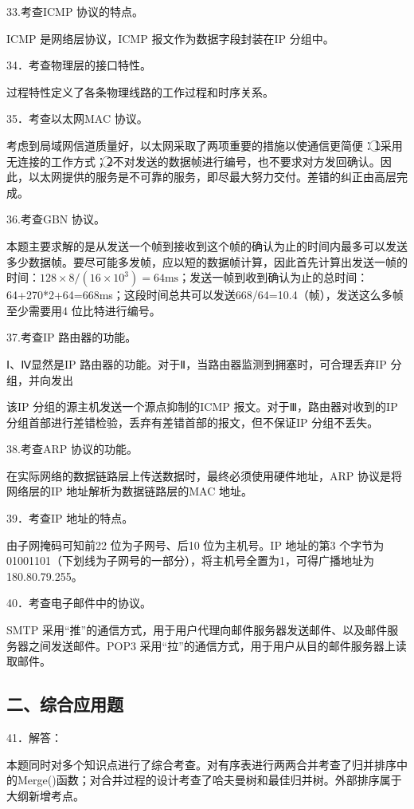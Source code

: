 \documentclass[UTF8,11pt]{ctexart}
\begin{document}
33.考查ICMP 协议的特点。


ICMP 是网络层协议，ICMP 报文作为数据字段封装在IP 分组中。


34．考查物理层的接口特性。


过程特性定义了各条物理线路的工作过程和时序关系。


35．考查以太网MAC 协议。


考虑到局域网信道质量好，以太网采取了两项重要的措施以使通信更简便：\textcircled{1}采用无连接的工作方式；\textcircled{2}不对发送的数据帧进行编号，也不要求对方发回确认。因此，以太网提供的服务是不可靠的服务，即尽最大努力交付。差错的纠正由高层完成。


36.考查GBN 协议。


本题主要求解的是从发送一个帧到接收到这个帧的确认为止的时间内最多可以发送多少数据帧。要尽可能多发帧，应以短的数据帧计算，因此首先计算出发送一帧的时间：\(\displaystyle 128\times8/(16\times10^3)=64\mathrm{ms}\)；发送一帧到收到确认为止的总时间：64+270*2+64=668ms；这段时间总共可以发送668/64=10.4（帧），发送这么多帧至少需要用4 位比特进行编号。


37.考查IP 路由器的功能。


Ⅰ、Ⅳ显然是IP 路由器的功能。对于Ⅱ，当路由器监测到拥塞时，可合理丢弃IP 分组，并向发出


该IP 分组的源主机发送一个源点抑制的ICMP 报文。对于Ⅲ，路由器对收到的IP 分组首部进行差错检验，丢弃有差错首部的报文，但不保证IP 分组不丢失。


38.考查ARP 协议的功能。


在实际网络的数据链路层上传送数据时，最终必须使用硬件地址，ARP 协议是将网络层的IP 地址解析为数据链路层的MAC 地址。


39．考查IP 地址的特点。


由子网掩码可知前22 位为子网号、后10 位为主机号。IP 地址的第3 个字节为01001101（下划线为子网号的一部分），将主机号全置为1，可得广播地址为180.80.79.255。


40．考查电子邮件中的协议。


SMTP 采用“推”的通信方式，用于用户代理向邮件服务器发送邮件、以及邮件服务器之间发送邮件。POP3 采用“拉”的通信方式，用于用户从目的邮件服务器上读取邮件。


\subsection*{二、综合应用题}

41．解答：


本题同时对多个知识点进行了综合考查。对有序表进行两两合并考查了归并排序中的Merge()函数；对合并过程的设计考查了哈夫曼树和最佳归并树。外部排序属于大纲新增考点。
\end{document}
